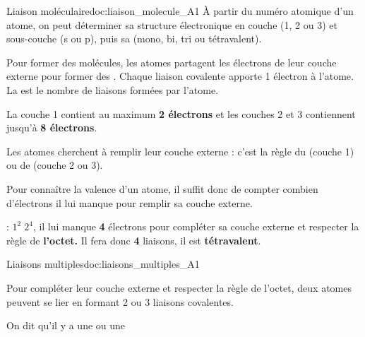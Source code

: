 \begin{doc}{Liaison moléculaire}{doc:liaison_molecule_A1}
  À partir du numéro atomique d'un atome, on peut déterminer sa structure électronique en couche (1, 2 ou 3) et sous-couche (s ou p), puis sa  (mono, bi, tri ou tétravalent).
  \begin{encart}
    Pour former des molécules, les atomes partagent les électrons de leur couche externe pour former des .
    Chaque liaison covalente apporte 1 électron à l'atome.
    La  est le nombre de liaisons formées par l'atome.
  \end{encart}
  \begin{encart}
    La couche 1 contient au maximum \textbf{2 électrons} et les couches 2 et 3 contiennent jusqu'à \textbf{8 électrons}.

    Les atomes cherchent à remplir leur couche externe : c'est la règle du  (couche 1) ou de  (couche 2 ou 3).
  \end{encart}
  Pour connaître la valence d'un atome, il suffit donc de compter combien d'électrons il lui manque pour remplir sa couche externe.

  \exemple {} : $1^2\; 2^4$,
  il lui manque \textbf{4} électrons pour compléter sa couche externe et respecter la règle de \textbf{l'octet.}
  Il fera donc \textbf{4} liaisons, il est \textbf{tétravalent}.
\end{doc}



%
\newpage
\vspace*{-30pt}


\begin{doc}{Liaisons multiples}{doc:liaisons_multiples_A1}
  \begin{encart}
    Pour compléter leur couche externe et respecter la règle de l'octet, deux atomes peuvent se lier en formant 2 ou 3 liaisons covalentes.
    
    On dit qu'il y a une  ou une 
  \end{encart}
\end{doc}

